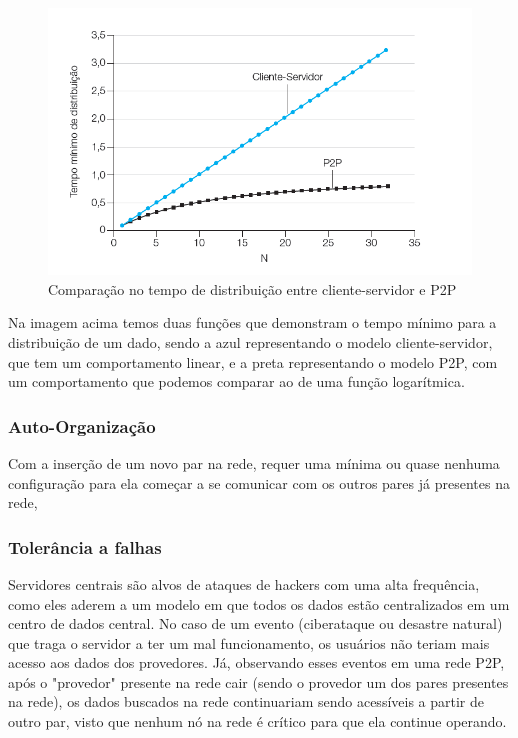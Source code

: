 \documentclass[a4paper]{article}
\begin{document}
\begin{figure}[!h]
	\begin{center}
		\includegraphics[scale=0.5]{img//p2p_distribution_time.png} 
		\caption{Comparação no tempo de distribuição entre cliente-servidor e P2P \cite{Kurose}}
	\end{center}
\end{figure}
Na imagem acima temos duas funções que demonstram o tempo mínimo para a distribuição de um dado, sendo a azul representando o modelo cliente-servidor, que tem um comportamento linear, e a preta representando o modelo P2P, com um comportamento que podemos comparar ao de uma função logarítmica. 
\subsubsection{Auto-Organização}
Com a inserção de um novo par na rede, requer uma mínima ou quase nenhuma configuração para ela começar a se comunicar com os outros pares já presentes na rede,\cite{ACohenBAD}

\subsubsection{Tolerância a falhas} 
Servidores centrais são alvos de ataques de hackers com uma alta frequência, como eles aderem a um modelo em que todos os dados estão centralizados em um centro de dados central. No caso de um evento (ciberataque ou desastre natural) que traga o servidor a ter um mal funcionamento, os usuários não teriam mais acesso aos dados dos provedores. Já, observando esses eventos em uma rede P2P, após o "provedor" presente na rede cair (sendo o provedor um dos pares presentes na rede), os dados buscados na rede continuariam sendo acessíveis a partir de outro par, visto que nenhum nó na rede é crítico para que ela continue operando.\cite{ACohenBAD}
\end{document}
